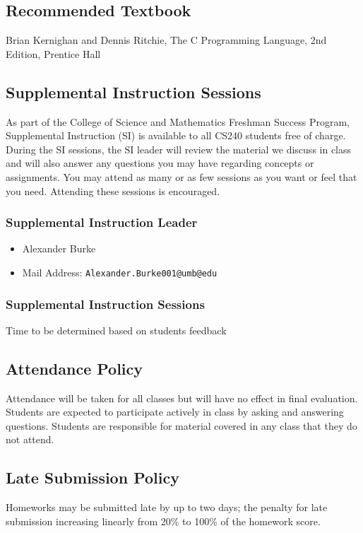 \documentclass[12pt,letterpaper,twoside]{article}
\begin{document}
\subsection*{Recommended Textbook}
Brian Kernighan and Dennis Ritchie, The C Programming Language, 2nd Edition, Prentice Hall

\subsection*{Supplemental Instruction Sessions}
As part of the College of Science and Mathematics Freshman Success Program, Supplemental Instruction (SI) is available to all CS240 students free of charge.
During the SI sessions, the SI leader will review the material we discuss in class and will also answer any questions you may have regarding concepts or assignments.
You may attend as many or as few sessions as you want or feel that you need. Attending these sessions is encouraged.

\subsubsection*{Supplemental Instruction Leader}
\begin{itemize}
\item[] Alexander Burke
\item[] Mail Address: \texttt{Alexander.Burke001@umb@edu}
\end{itemize}

\subsubsection*{Supplemental Instruction Sessions}
Time to be determined based on students feedback

\subsection*{Attendance Policy}
Attendance will be taken for all classes but will have no effect in final evaluation.
Students are expected to participate actively in class by asking and answering questions.
Students are responsible for material covered in any class that they do not attend.

\subsection*{Late Submission Policy}
Homeworks may be submitted late by up to two days; the penalty for late submission increasing linearly from 20\% to 100\% of the homework score.
\end{document}
